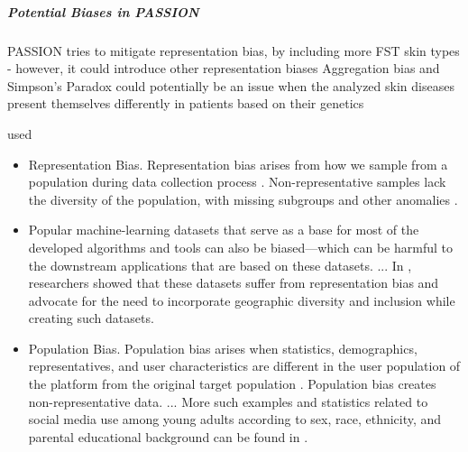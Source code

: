 \begin{refsection}
		
		\subparagraph{Potential Biases in PASSION}
		PASSION tries to mitigate representation bias, by including more FST skin types - however, it could introduce other representation biases
		Aggregation bias and Simpson's Paradox could potentially be an issue when the analyzed skin diseases present themselves differently in patients based on their genetics
		
		
		\rawcitationstart
		used
		\begin{itemize}		
			\rawcitationusedstart
			\item Representation Bias. Representation bias arises from how we sample from a population during data collection process \autocite{M144_Suresh_2021}. Non-representative samples lack the diversity of the population, with missing subgroups and other anomalies \autocite{Mehrabi_2021}.
			\item Popular machine-learning datasets that serve as a base for most of the developed algorithms and tools can also be biased—which can be harmful to the downstream applications that are based on these datasets. ... In \autocite{M142_Shankar_2017}, researchers showed that these datasets suffer from representation bias and advocate for the need to incorporate geographic diversity and inclusion while creating such datasets. \autocite{Mehrabi_2021}
			
			\item Population Bias. Population bias arises when statistics, demographics, representatives, and user characteristics are different in the user population of the platform from the original target population \autocite{M120_Olteanu_2019}. Population bias creates non-representative data. ... More such examples and statistics related to social media use among young adults according to sex, race, ethnicity, and parental educational background can be found in \autocite{M64_Hargittai_2007}. \autocite{Mehrabi_2021}
			

\end{itemize}
\end{refsection}
